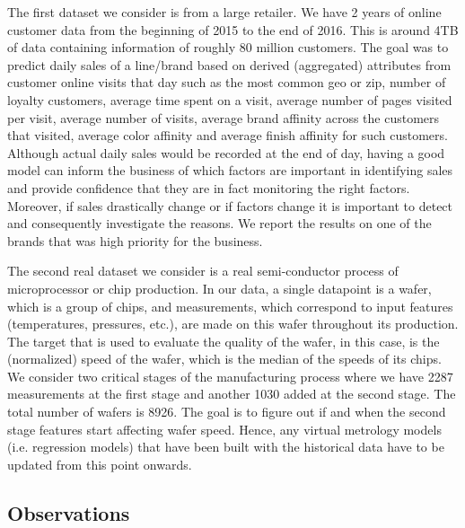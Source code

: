 \documentclass{article}
\begin{document}
The first dataset we consider is from a large retailer. We have 2 years of online customer data from the beginning of 2015 to the end of 2016. This is around 4TB of data containing information of roughly 80 million customers. The goal was to predict daily sales of a line/brand based on derived (aggregated) attributes from customer online visits that day such as the most common geo or zip, number of loyalty customers, average time spent on a visit, average number of pages visited per visit, average number of visits, average brand affinity across the customers that visited, average color affinity and average finish affinity for such customers. Although actual daily sales would be recorded at the end of day, having a good model can inform the business of which factors are important in identifying sales and provide confidence that they are in fact monitoring the right factors. Moreover, if sales drastically change or if factors change it is important to detect and consequently investigate the reasons. We report the results on one of the brands that was high priority for the business.

The second real dataset we consider is a real semi-conductor process of
microprocessor or chip production. In our data, a single datapoint is
a wafer, which is a group of chips, and measurements, which correspond
to input features (temperatures, pressures, etc.), are made on this wafer throughout its
production. The target that is used to evaluate the quality of the wafer,
in this case, is the (normalized) speed of the wafer, which is the median of the
speeds of its chips. We consider two critical stages of the manufacturing process where we have 2287 measurements at the first stage and another 1030 added at the second stage. The total number of wafers is 8926. The goal is to figure out if and when the second stage features start affecting wafer speed. Hence, any virtual metrology models (i.e. regression models) that have been built with the historical data have to be updated from this point onwards.


\subsection{Observations}
\end{document}
